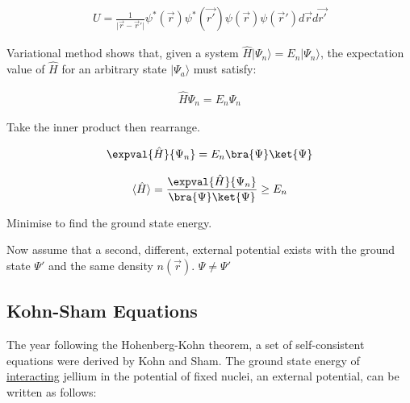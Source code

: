 \begin{equation}
\begin{split}
U = \frac{1}{\lvert \vec{r} - \vec{r}' \rvert} \psi^{*}(\vec{r}) \psi^{*}(\vec{r'}) \psi(\vec{r}) \psi(\vec{r}') d\vec{r} d\vec{r'}
\end{split}
\label{eq:eqKinetic}
\end{equation}



Variational method shows that, given a system $\hat{H} \lvert \Psi_n \rangle = E_n \lvert \Psi_n \rangle$, the expectation value of $\hat{H}$ for an arbitrary state $\lvert \Psi_a \rangle$ must satisfy:


\begin{equation}
\begin{split}
\hat{H} \Psi_{n} = E_{n} \Psi_{n}
\end{split}
\label{eq:eqVariationalMethod}
\end{equation}

Take the inner product then rearrange.

\begin{equation}
\begin{split}
\expval{\hat{H}}{\Psi_{n}} = E_{n} \bra{\Psi}\ket{\Psi}
\end{split}
\label{eq:eqVariationalMethod}
\end{equation}

\begin{equation}
\begin{split}
\langle \hat{H} \rangle = \frac{\expval{\hat{H}}{\Psi_{n}}}{\bra{\Psi}\ket{\Psi}} \geq E_{n}
\end{split}
\label{eq:eqTimeIndependentSchrodinger}
\end{equation}

Minimise to find the ground state energy.


Now assume that a second, different, external potential exists with the ground state $\Psi'$ and the same density $n(\vec{r})$.  $\Psi \neq \Psi'$






\subsection{Kohn-Sham Equations}

The year following the Hohenberg-Kohn theorem, a set of self-consistent equations were derived by Kohn and Sham.  The ground state energy of \underline{interacting} jellium in the potential of fixed nuclei, an external potential, can be written as follows\cite{kohnsham}: 

